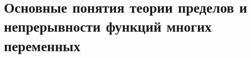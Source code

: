 \documentclass[10pt]{extarticle}
\numberwithin{equation}{subsection} %
\numberwithin{subsection}{section}  %
\begin{document}
	
	
	

	\section{Основные понятия теории пределов и непрерывности функций многих переменных}
	
	
	
	
\end{document}
